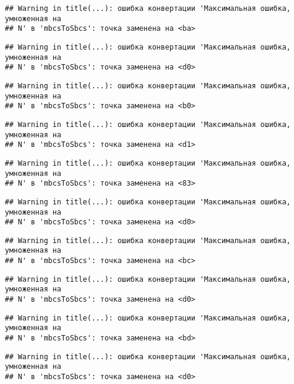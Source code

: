 \documentclass[
]{article}
\begin{document}
\begin{verbatim}
## Warning in title(...): ошибка конвертации 'Максимальная ошибка, умноженная на
## N' в 'mbcsToSbcs': точка заменена на <ba>
\end{verbatim}

\begin{verbatim}
## Warning in title(...): ошибка конвертации 'Максимальная ошибка, умноженная на
## N' в 'mbcsToSbcs': точка заменена на <d0>
\end{verbatim}

\begin{verbatim}
## Warning in title(...): ошибка конвертации 'Максимальная ошибка, умноженная на
## N' в 'mbcsToSbcs': точка заменена на <b0>
\end{verbatim}

\begin{verbatim}
## Warning in title(...): ошибка конвертации 'Максимальная ошибка, умноженная на
## N' в 'mbcsToSbcs': точка заменена на <d1>
\end{verbatim}

\begin{verbatim}
## Warning in title(...): ошибка конвертации 'Максимальная ошибка, умноженная на
## N' в 'mbcsToSbcs': точка заменена на <83>
\end{verbatim}

\begin{verbatim}
## Warning in title(...): ошибка конвертации 'Максимальная ошибка, умноженная на
## N' в 'mbcsToSbcs': точка заменена на <d0>
\end{verbatim}

\begin{verbatim}
## Warning in title(...): ошибка конвертации 'Максимальная ошибка, умноженная на
## N' в 'mbcsToSbcs': точка заменена на <bc>
\end{verbatim}

\begin{verbatim}
## Warning in title(...): ошибка конвертации 'Максимальная ошибка, умноженная на
## N' в 'mbcsToSbcs': точка заменена на <d0>
\end{verbatim}

\begin{verbatim}
## Warning in title(...): ошибка конвертации 'Максимальная ошибка, умноженная на
## N' в 'mbcsToSbcs': точка заменена на <bd>
\end{verbatim}

\begin{verbatim}
## Warning in title(...): ошибка конвертации 'Максимальная ошибка, умноженная на
## N' в 'mbcsToSbcs': точка заменена на <d0>
\end{verbatim}
\end{document}

